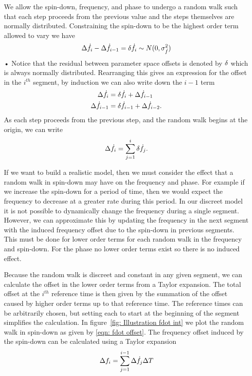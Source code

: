 We allow the spin-down, frequency, and phase to undergo a random walk such that
each step proceeds from the previous value and the steps themselves are
normally distributed. Constraining the spin-down to be the highest order term
allowed to vary we have
\begin{equation}
\Delta \dot{f}_{i} - \Delta\dot{f}_{i-1} = \delta \dot{f}_{i} \sim N(0, \sigma_{\dot{f}}^{2})
\end{equation}•
Notice that the residual between parameter space offsets is denoted by $\delta$
which is always normally distributed. Rearranging this gives an expression for
the offset in the $i^{th}$ segment, by induction we can also write down the
$i-1$ term
\begin{align}
\Delta\dot{f}_{i} &  = \delta\dot{f}_{i} + \Delta\dot{f}_{i-1}  \\
\Delta\dot{f}_{i-1} &  = \delta\dot{f}_{i-1} + \Delta\dot{f}_{i-2}  .
\end{align}
As each step proceeds from the previous step, and the random walk begins at the
origin, we can write
\begin{equation} 
\Delta\dot{f}_{i} = \sum_{j=1}^{i}\delta\dot{f}_{j}.
\label{eqn: fdot offset} 
\end{equation}

If we want to build a realistic model, then we must consider the effect that a
random walk in spin-down may have on the frequency and phase. For example if we
increase the spin-down for a period of time, then we would expect the frequency
to decrease at a greater rate during this period. In our discreet model it is
not possible to dynamically change the frequency during a single segment.
However, we can approximate this by updating the frequency in the next
segment with the induced frequency offset due to the spin-down in previous
segments. This must be done for lower order terms for each random walk in the
frequency and spin-down. For the phase no lower order terms exist so there is no
induced effect.

Because the random walk is discreet and constant in any given segment, we can
calculate the offset in the lower order terms from a Taylor expansion. The
total offset at the  $i^{th}$ reference time is then given by the summation of
the offset caused by higher order terms up to that reference time. The reference times
can be arbitrarily chosen, but setting each to start at the beginning of the segment
simplifies the calculation.
In figure~\ref{fig: Illustration fdot int} we plot the random walk in spin-down as given by 
\eqref{eqn: fdot offset}. The frequency offset induced by the spin-down can be
calculated using a Taylor expansion
\begin{equation}
\Delta f_{i} = \sum_{j=1}^{i-1}\Delta\dot{f}_{j} \Delta T 
\label{eqn: f offset induced} 
\end{equation}

